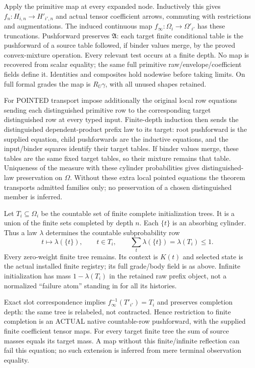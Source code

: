 \documentclass[11pt]{article}
\begin{document}
Apply the primitive map at every expanded node. Inductively this gives $f_n:H_{i,n}\to H'_{i',n}$ and actual tensor coefficient arrows, commuting with restrictions and augmentations. The induced continuous map $f_\infty:\Omega_i\to\Omega'_{i'}$ has these truncations. Pushforward preserves $\mathfrak A$: each target finite conditional table is the pushforward of a source table followed, if binder values merge, by the proved convex-mixture operation. Every relevant test occurs at a finite depth. No map is recovered from scalar equality; the same full primitive raw/envelope/coefficient fields define it. Identities and composites hold nodewise before taking limits. On full formal grades the map is $R_U\gamma$, with all unused shapes retained.

For POINTED transport impose additionally the original local row equations sending each distinguished primitive row to the corresponding target distinguished row at every typed input. Finite-depth induction then sends the distinguished dependent-product prefix law to its target: root pushforward is the supplied equation, child pushforwards are the inductive equations, and the input/binder squares identify their target tables. If binder values merge, these tables are the same fixed target tables, so their mixture remains that table. Uniqueness of the measure with these cylinder probabilities gives distinguished-law preservation on $\Omega$. Without these extra local pointed equations the theorem transports admitted families only; no preservation of a chosen distinguished member is inferred.

Let $T_i\subseteq\Omega_i$ be the countable set of finite complete initialization trees. It is a union of the finite sets completed by depth $n$. Each $\{t\}$ is an absorbing cylinder. Thus a law $\lambda$ determines the countable subprobability row
\[
      t\longmapsto\lambda(\{t\}),\qquad t\in T_i,
      \qquad\sum_t\lambda(\{t\})=\lambda(T_i)\le1.
\]
Every zero-weight finite tree remains. Its context is $K(t)$ and selected state is the actual installed finite registry; its full grade/body field is as above. Infinite initialization has mass $1-\lambda(T_i)$ in the retained raw prefix object, not a normalized ``failure atom'' standing in for all its histories.

Exact slot correspondence implies $f_\infty^{-1}(T'_{i'})=T_i$ and preserves completion depth: the same tree is relabeled, not contracted. Hence restriction to finite completion is an ACTUAL native countable-row pushforward, with the supplied finite coefficient tensor maps. For every target finite tree the sum of source masses equals its target mass. A map without this finite/infinite reflection can fail this equation; no such extension is inferred from mere terminal observation equality.
\end{document}
